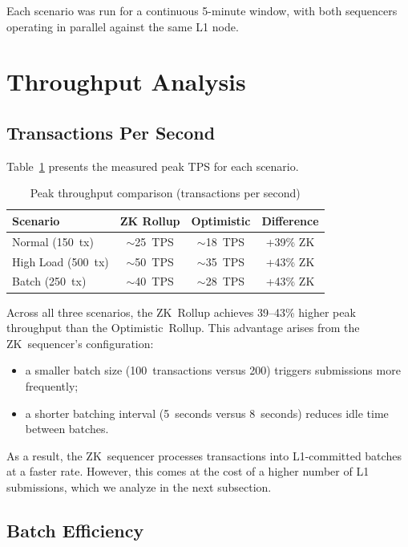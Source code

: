 Each scenario was run for a continuous 5-minute window, with both sequencers operating in parallel against the same L1 node.

\section{Throughput Analysis}

\subsection{Transactions Per Second}

Table~\ref{tab:tps-results} presents the measured peak TPS for each scenario.

\begin{table}[h]
    \centering
    \begin{tabular}{l|c|c|c}
        \hline
        \textbf{Scenario} & \textbf{ZK Rollup} & \textbf{Optimistic} & \textbf{Difference} \\
        \hline
        Normal (150~tx) & $\sim$25~TPS & $\sim$18~TPS & +39\% ZK \\
        \hline
        High Load (500~tx) & $\sim$50~TPS & $\sim$35~TPS & +43\% ZK \\
        \hline
        Batch (250~tx) & $\sim$40~TPS & $\sim$28~TPS & +43\% ZK \\
        \hline
    \end{tabular}
    \caption{Peak throughput comparison (transactions per second)}
    \label{tab:tps-results}
\end{table}

Across all three scenarios, the ZK~Rollup achieves 39--43\% higher peak throughput than the Optimistic~Rollup. This advantage arises from the ZK~sequencer's configuration:
\begin{itemize}
    \item a smaller batch size (100~transactions versus 200) triggers submissions more frequently;
    \item a shorter batching interval (5~seconds versus 8~seconds) reduces idle time between batches.
\end{itemize}

As a result, the ZK~sequencer processes transactions into L1-committed batches at a faster rate. However, this comes at the cost of a higher number of L1 submissions, which we analyze in the next subsection.

\subsection{Batch Efficiency}

